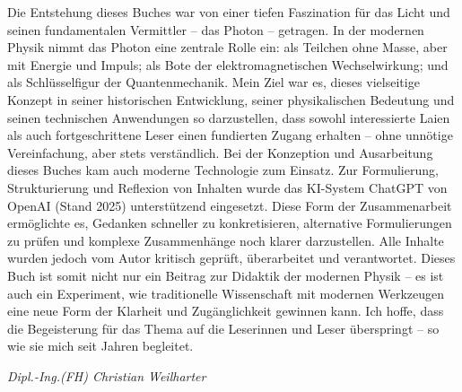 Die Entstehung dieses Buches war von einer tiefen Faszination für das Licht und seinen fundamentalen Vermittler – das Photon – getragen. In der modernen Physik nimmt das Photon eine zentrale Rolle ein: als Teilchen ohne Masse, aber mit Energie und Impuls; als Bote der elektromagnetischen Wechselwirkung; und als Schlüsselfigur der Quantenmechanik.
	\noindent
Mein Ziel war es, dieses vielseitige Konzept in seiner historischen Entwicklung, seiner physikalischen Bedeutung und seinen technischen Anwendungen so darzustellen, dass sowohl interessierte Laien als auch fortgeschrittene Leser einen fundierten Zugang erhalten – ohne unnötige Vereinfachung, aber stets verständlich.
	\noindent
Bei der Konzeption und Ausarbeitung dieses Buches kam auch moderne Technologie zum Einsatz. Zur Formulierung, Strukturierung und Reflexion von Inhalten wurde das KI-System ChatGPT von OpenAI (Stand 2025) unterstützend eingesetzt. Diese Form der Zusammenarbeit ermöglichte es, Gedanken schneller zu konkretisieren, alternative Formulierungen zu prüfen und komplexe Zusammenhänge noch klarer darzustellen.
Alle Inhalte wurden jedoch vom Autor kritisch geprüft, überarbeitet und verantwortet.
	\noindent
Dieses Buch ist somit nicht nur ein Beitrag zur Didaktik der modernen Physik – es ist auch ein Experiment, wie traditionelle Wissenschaft mit modernen Werkzeugen eine neue Form der Klarheit und Zugänglichkeit gewinnen kann.
	\noindent
Ich hoffe, dass die Begeisterung für das Thema auf die Leserinnen und Leser überspringt – so wie sie mich seit Jahren begleitet.



\begin{flushright}
	\textit{Dipl.-Ing.(FH) Christian Weilharter} \\
\medskip
	[Traunstein, 2025]
\end{flushright}


